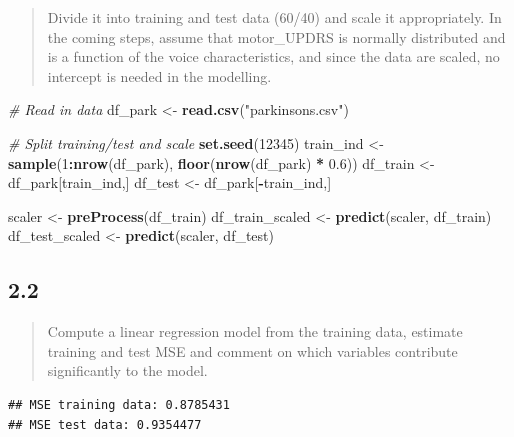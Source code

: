 \documentclass[
]{article}
\newenvironment{Shaded}{\begin{snugshade}}{\end{snugshade}}
\newcommand{\CommentTok}[1]{\textcolor[rgb]{0.56,0.35,0.01}{\textit{#1}}}
\newcommand{\DecValTok}[1]{\textcolor[rgb]{0.00,0.00,0.81}{#1}}
\newcommand{\FloatTok}[1]{\textcolor[rgb]{0.00,0.00,0.81}{#1}}
\newcommand{\FunctionTok}[1]{\textcolor[rgb]{0.13,0.29,0.53}{\textbf{#1}}}
\newcommand{\NormalTok}[1]{#1}
\newcommand{\OtherTok}[1]{\textcolor[rgb]{0.56,0.35,0.01}{#1}}
\newcommand{\SpecialCharTok}[1]{\textcolor[rgb]{0.81,0.36,0.00}{\textbf{#1}}}
\newcommand{\StringTok}[1]{\textcolor[rgb]{0.31,0.60,0.02}{#1}}
\begin{document}
\begin{quote}
Divide it into training and test data (60/40) and scale it
appropriately. In the coming steps, assume that motor\_UPDRS is normally
distributed and is a function of the voice characteristics, and since
the data are scaled, no intercept is needed in the modelling.
\end{quote}

\begin{Shaded}
\begin{Highlighting}[]
\CommentTok{\# Read in data}
\NormalTok{df\_park }\OtherTok{\textless{}{-}} \FunctionTok{read.csv}\NormalTok{(}\StringTok{"parkinsons.csv"}\NormalTok{)}

\CommentTok{\# Split training/test and scale}
\FunctionTok{set.seed}\NormalTok{(}\DecValTok{12345}\NormalTok{)}
\NormalTok{train\_ind }\OtherTok{\textless{}{-}} \FunctionTok{sample}\NormalTok{(}\DecValTok{1}\SpecialCharTok{:}\FunctionTok{nrow}\NormalTok{(df\_park), }\FunctionTok{floor}\NormalTok{(}\FunctionTok{nrow}\NormalTok{(df\_park) }\SpecialCharTok{*} \FloatTok{0.6}\NormalTok{))}
\NormalTok{df\_train }\OtherTok{\textless{}{-}}\NormalTok{ df\_park[train\_ind,]}
\NormalTok{df\_test }\OtherTok{\textless{}{-}}\NormalTok{ df\_park[}\SpecialCharTok{{-}}\NormalTok{train\_ind,]}

\NormalTok{scaler }\OtherTok{\textless{}{-}} \FunctionTok{preProcess}\NormalTok{(df\_train)}
\NormalTok{df\_train\_scaled }\OtherTok{\textless{}{-}} \FunctionTok{predict}\NormalTok{(scaler, df\_train)}
\NormalTok{df\_test\_scaled }\OtherTok{\textless{}{-}} \FunctionTok{predict}\NormalTok{(scaler, df\_test)}
\end{Highlighting}
\end{Shaded}

\hypertarget{section-6}{%
\subsection{2.2}\label{section-6}}

\begin{quote}
Compute a linear regression model from the training data, estimate
training and test MSE and comment on which variables contribute
significantly to the model.
\end{quote}

\begin{verbatim}
## MSE training data: 0.8785431
## MSE test data: 0.9354477
\end{verbatim}
\end{document}
